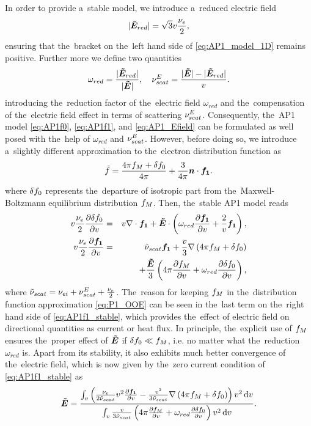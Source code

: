 In order to provide a~stable model, we introduce a~reduced electric field
\begin{equation}
  |\boldsymbol{\tilde{E}}_{red}| = \sqrt{3} v\frac{\nu_{e}}{2} ,
  \label{eq:Elimit}
\end{equation}
ensuring that the~bracket on the~left hand side of \eqref{eq:AP1_model_1D}
remains positive. Further more we define two quantities
\begin{equation}
  \omega_{red} = \frac{|\boldsymbol{\tilde{E}}_{red}|}{|\boldsymbol{\tilde{E}}|} ,\quad 
  \nu_{scat}^E = \frac{|\boldsymbol{\tilde{E}}| - |\boldsymbol{\tilde{E}}_{red}|}{v} .
  \nonumber
\end{equation}
introducing the~reduction factor of the~electric field
$\omega_{red}$ and the~compensation of the~electric field effect in terms of
scattering $\nu_{scat}^E$. Consequently, the~AP1 model \eqref{eq:AP1f0}, 
\eqref{eq:AP1f1}, and \eqref{eq:AP1_Efield} can be formulated as well posed 
with the~help of $\omega_{red}$ and $\nu_{scat}^E$. However, before doing so,
we introduce a~slightly different approximation to the~electron distribution 
function as
\begin{equation}
  \tilde{f} = \frac{4\pi f_M + \delta f_0}{4\pi} + \frac{3}{4\pi}\boldsymbol{n}\cdot\boldsymbol{f_1} .
  \label{eq:P1_OOE}
\end{equation}
where $\delta f_0$ represents the~departure of isotropic part from 
the~Maxwell-Boltzmann equilibrium distribution $f_M$. 
Then, the~stable AP1 model reads
\begin{eqnarray}
  v \frac{\nu_{e}}{2}\frac{\partial{\delta f_0}}{\partial{v}} &=&
  v\nabla\cdot\boldsymbol{f_1} + \boldsymbol{\tilde{E}}\cdot\left(\omega_{red} \frac{\partial{\boldsymbol{f_1}}}{\partial{v}} 
  + \frac{2}{v}\boldsymbol{f_1}\right) , 
  \label{eq:AP1f0_stable}\\
  v\frac{\nu_{e}}{2}\frac{\partial{\boldsymbol{f_1}}}{\partial{v}} 
  &=& \tilde{\nu}_{scat}\boldsymbol{f_1} 
  + \frac{v}{3}\nabla\left(4\pi f_M + \delta f_0\right)
  \nonumber \\
  && 
  + \frac{\boldsymbol{\tilde{E}}}{3}\left(4\pi \frac{\partial{f_M}}{\partial{v}} 
  + \omega_{red} \frac{\partial{\delta f_0}}{\partial{v}} 
  \right) ,
  \label{eq:AP1f1_stable}
\end{eqnarray}
where $\tilde{\nu}_{scat} = \nu_{ei} + \nu_{scat}^E + \frac{\nu_{e}}{2}$.
The~reason for keeping $f_M$ in the~distribution function approximation
\eqref{eq:P1_OOE} can be seen in the~last term on the~right hand side of 
\eqref{eq:AP1f1_stable}, which provides the~effect of electric field on
directional quantities as current or heat flux. In principle, the~explicit use
of $f_M$ ensures the~proper effect of $\boldsymbol{\tilde{E}}$ if $\delta f_0 \ll f_M$, i.e.
no matter what the~reduction $\omega_{red}$ is. Apart from its stability,
it also exhibits much better convergence of the~electric field, which is now
given by the~zero current condition of \eqref{eq:AP1f1_stable} as
\begin{equation}
  \boldsymbol{\tilde{E}} =
  \frac{\int_{v} \left(\frac{\nu_{e}}{2\tilde{\nu}_{scat}}v^2\frac{\partial{\boldsymbol{f_1}}}{\partial{v}}
  - \frac{v^2}{3\tilde{\nu}_{scat}}
  \nabla\left(4\pi f_M + \delta f_0\right)\right) v^2\, \text{d}v}
  {\int_{v} \frac{v}
  {3\tilde{\nu}_{scat}}
  \left(4\pi\frac{\partial{f_M}}{\partial{v}} + \omega_{red} \frac{\partial{\delta f_0}}{\partial{v}}\right)
  v^2\, \text{d}v} .
  \label{eq:AP1_Efield_stable}
\end{equation}

